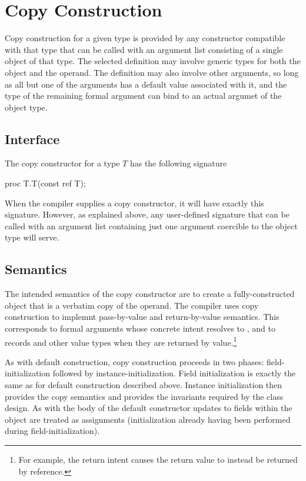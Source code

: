 \section{Copy Construction}

Copy construction for a given type is provided by any constructor compatible
with that type that can be called with an argument list consisting of a single
object of that type.  The selected definition may involve generic types for both
the object and the operand.  The definition may also involve other arguments, so
long as all but one of the arguments has a default value associated with it, and
the type of the remaining formal argument can bind to an actual argumet of the
object type.

\subsection{Interface}

The copy constructor for a type $T$ has the following signature
\begin{chapel}
proc T.T(const ref T);
\end{chapel}
When the compiler supplies a copy constructor, it will have exactly this
signature.  However, as explained above, any user-defined signature that can be
called with an argument list containing just one argument coercible to the
object type will serve.

\subsection{Semantics}

The intended semantics of the copy constructor are to create a fully-constructed
object that is a verbatim copy of the operand.  The compiler uses copy
construction to implemnt pass-by-value and return-by-value semantics.  This
corresponds to formal arguments whose concrete intent resolves to , and
to records and other value types when they are returned by value.\footnote{For
  example, the return intent  causes the return value to instead be
  returned by reference.}

As with default construction, copy construction proceeds in two phases:
field-initialization followed by instance-initialization.  Field initialization
is exactly the same as for default construction described above.  Instance
initialization then provides the copy semantics and provides the invariants
required by the class design.  As with the body of the default constructor
updates to fields within the object are treated as assignments (initialization
already having been performed during field-initialization).

